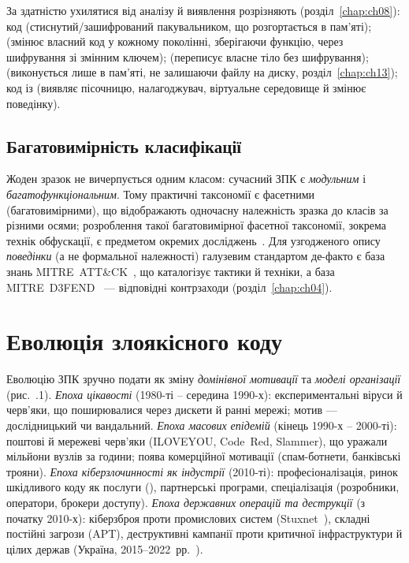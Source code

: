 За здатністю ухилятися від аналізу й виявлення розрізняють (розділ~\ref{chap:ch08}):  код (стиснутий/зашифрований пакувальником, що розгортається в пам'яті);  (змінює власний код у кожному поколінні, зберігаючи функцію, через шифрування зі змінним ключем);  (переписує власне тіло без шифрування);  (виконується лише в пам'яті, не залишаючи файлу на диску, розділ~\ref{chap:ch13}); код із  (виявляє пісочницю, налагоджувач, віртуальне середовище й змінює поведінку).

\subsection{Багатовимірність класифікації}

Жоден зразок не вичерпується одним класом: сучасний ЗПК є \emph{модульним} і \emph{багатофункціональним}. Тому практичні таксономії є фасетними (багатовимірними), що відображають одночасну належність зразка до класів за різними осями; розроблення такої багатовимірної фасетної таксономії, зокрема технік обфускації, є предметом окремих досліджень~\cite{ch01:shevchenko}. Для узгодженого опису \emph{поведінки} (а не формальної належності) галузевим стандартом де-факто є база знань MITRE~ATT\&CK~\cite{mitre-attack}, що каталогізує тактики й техніки, а база MITRE~D3FEND~\cite{mitre-defend} --- відповідні контрзаходи (розділ~\ref{chap:ch04}).

\section{Еволюція злоякісного коду}\label{sec:ch01-evolution}

Еволюцію ЗПК зручно подати як зміну \emph{домінівної мотивації} та \emph{моделі організації} (рис.~\thechapter.1). \emph{Епоха цікавості} (1980-ті -- середина 1990-х): експериментальні віруси й черв'яки, що поширювалися через дискети й ранні мережі; мотив --- дослідницький чи вандальний. \emph{Епоха масових епідемій} (кінець 1990-х -- 2000-ті): поштові й мережеві черв'яки (ILOVEYOU, Code~Red, Slammer), що уражали мільйони вузлів за години; поява комерційної мотивації (спам-ботнети, банківські трояни). \emph{Епоха кіберзлочинності як індустрії} (2010-ті): професіоналізація, ринок шкідливого коду як послуги (), партнерські програми, спеціалізація (розробники, оператори, брокери доступу). \emph{Епоха державних операцій та деструкції} (з початку 2010-х): кіберзброя проти промислових систем (Stuxnet~\cite{stuxnet,ch01:zetter}), складні постійні загрози (APT), деструктивні кампанії проти критичної інфраструктури й цілих держав (Україна, 2015--2022~рр.~\cite{ch01:greenberg}).

